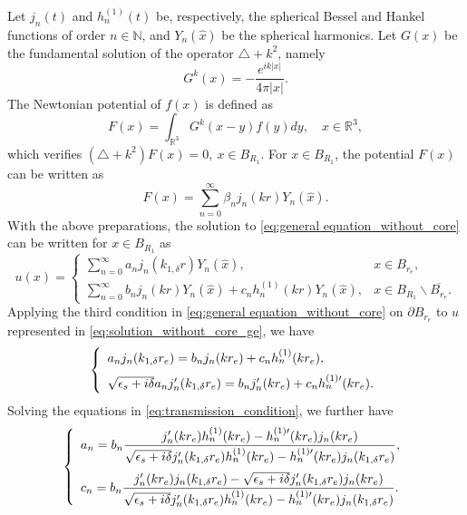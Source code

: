\documentclass[11pt,reqno,twoside]{amsart}
\theoremstyle{definition}
\theoremstyle{remark}
\numberwithin{equation}{section}
\begin{document}
Let $j_n(t)$ and $h_n^{(1)}(t)$ be, respectively, the spherical Bessel and Hankel functions of order $n\in \mathbb{N}$, and $Y_n(\hat{x})$ be the spherical harmonics. Let $G(x)$ be the fundamental solution of the operator $\triangle+k^2$, namely
\begin{equation}\label{eq:fundamental_solution}
 G^{k}(x)=-\frac{e^{ik|x|}}{4\pi |x|}.
\end{equation}
The Newtonian potential of $f(x)$ is defined as
\begin{equation}\label{eq:potential_F}
  F(x)=\int_{\mathbb{R}^3} G^k(x-y)f(y)dy, \quad x\in\mathbb{R}^3,
\end{equation}
which verifies $(\triangle + k^2)F(x)=0,\ x\in B_{R_1}$. For $x\in B_{R_1}$, the potential $F(x)$ can be written as
\begin{equation}\label{eq:potential_F_expression}
 F(x)=\sum_{n=0}^{\infty} \beta_n j_n(kr)Y_n(\hat{x}).
\end{equation}
With the above preparations, the solution to \eqref{eq:general equation_without_core} can be written for $x\in B_{R_1}$ as
\begin{equation}\label{eq:solution_without_core_ge}
  u(x)=\left\{
         \begin{array}{ll}
          {\sum_{n=0}^{\infty} a_n j_n(k_{1,\delta}r) Y_n(\hat{x}),} & x\in B_{r_e}, \\
         { \sum_{n=0}^{\infty} b_n j_n(kr) Y_n(\hat{x}) + c_n h_n^{(1)}(kr) Y_n(\hat{x}) ,} & x\in B_{R_1}\backslash \overline{B_{r_e}}.
         \end{array}
       \right.
\end{equation}
Applying the third condition in \eqref{eq:general equation_without_core} on $\partial B_{r_e}$ to $u$ represented in \eqref{eq:solution_without_core_ge}, we have
\begin{equation}\label{eq:transmission_condition}
  \left\{
    \begin{array}{ll}
      a_n j_n(k_{1,\delta} r_e)=b_n j_n(kr_e) + c_n h_n^{(1)}(kr_e) ,\medskip \\
      \sqrt{\epsilon_s+i\delta}a_n j_n^{\prime}(k_{1,\delta} r_e)=b_n j_n^{\prime}(kr_e) + c_n  h_n^{(1)\prime}(kr_e).
    \end{array}
  \right.
\end{equation}
Solving the equations in \eqref{eq:transmission_condition}, we further have
\begin{equation}\label{eq:solution_without_core}
  \left\{
    \begin{array}{ll}
     \displaystyle{ a_n=b_n \frac{j_n^{\prime}(kr_e) h_n^{(1)}(kr_e)- h_n^{(1)\prime}(kr_e)j_n(kr_e)} {\sqrt{\epsilon_s+i\delta} j_n^{\prime}(k_{1,\delta} r_e)h_n^{(1)}(kr_e) - h_n^{(1)\prime}(kr_e)j_n(k_{1,\delta} r_e)  },}\medskip\\
    \displaystyle{  c_n=b_n \frac{j_n^{\prime}(kr_e) j_n(k_{1,\delta} r_e) -\sqrt{\epsilon_s+i\delta}j_n^{\prime}(k_{1,\delta} r_e)j_n(kr_e)}{\sqrt{\epsilon_s+i\delta} j_n^{\prime}(k_{1,\delta} r_e)h_n^{(1)}(kr_e) - h_n^{(1)\prime}(kr_e)j_n(k_{1,\delta} r_e)  }.}
    \end{array}
  \right.
\end{equation}
\end{document}

